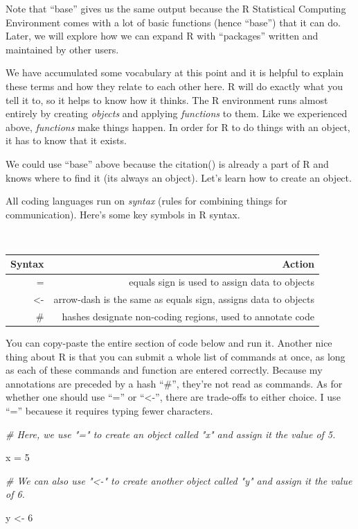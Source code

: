 \documentclass[
]{article}
\newenvironment{Shaded}{\begin{snugshade}}{\end{snugshade}}
\newcommand{\CommentTok}[1]{\textcolor[rgb]{0.56,0.35,0.01}{\textit{#1}}}
\newcommand{\DecValTok}[1]{\textcolor[rgb]{0.00,0.00,0.81}{#1}}
\newcommand{\NormalTok}[1]{#1}
\newcommand{\OtherTok}[1]{\textcolor[rgb]{0.56,0.35,0.01}{#1}}
\begin{document}
Note that ``base'' gives us the same output because the R Statistical
Computing Environment comes with a lot of basic functions (hence
``base'') that it can do. Later, we will explore how we can expand R
with ``packages'' written and maintained by other users.

We have accumulated some vocabulary at this point and it is helpful to
explain these terms and how they relate to each other here. R will do
exactly what you tell it to, so it helps to know how it thinks. The R
environment runs almost entirely by creating \emph{objects} and applying
\emph{functions} to them. Like we experienced above, \emph{functions}
make things happen. In order for R to do things with an object, it has
to know that it exists.

We could use ``base'' above because the citation() is already a part of
R and knows where to find it (its always an object). Let's learn how to
create an object.

All coding languages run on \emph{syntax} (rules for combining things
for communication). Here's some key symbols in R syntax.\\
\strut \\

\begin{longtable}[]{@{}rr@{}}
\toprule()
Syntax & Action \\
\midrule()
\endhead
= & equals sign is used to assign data to objects \\
\textless- & arrow-dash is the same as equals sign, assigns data to
objects \\
\# & hashes designate non-coding regions, used to annotate code \\
\bottomrule()
\end{longtable}

You can copy-paste the entire section of code below and run it. Another
nice thing about R is that you can submit a whole list of commands at
once, as long as each of these commands and function are entered
correctly. Because my annotations are preceded by a hash ``\#'', they're
not read as commands. As for whether one should use ``='' or
``\textless-'', there are trade-offs to either choice. I use ``=''
becauese it requires typing fewer characters.

\begin{Shaded}
\begin{Highlighting}[]
\CommentTok{\# Here, we use "=" to create an object called "x" and assign it the value of 5.}

\NormalTok{x }\OtherTok{=} \DecValTok{5}

\CommentTok{\# We can also use "\textless{}{-}" to create another object called "y" and assign it the value of 6.}

\NormalTok{y }\OtherTok{\textless{}{-}} \DecValTok{6}
\end{Highlighting}
\end{Shaded}
\end{document}
